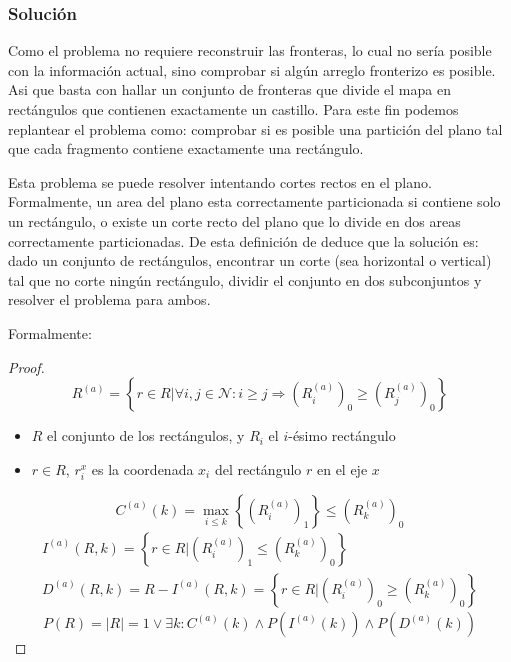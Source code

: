 \subsubsection{Soluci\'on}

Como el problema no requiere reconstruir las fronteras, lo cual no sería posible con la información actual, sino comprobar si algún arreglo fronterizo es posible. Asi que basta con hallar un conjunto de fronteras que divide el mapa en rectángulos que contienen exactamente un castillo. Para este fin podemos replantear el problema como: comprobar si es posible una partición del plano tal que cada fragmento contiene exactamente una rectángulo.

Esta problema se puede resolver intentando cortes rectos en el plano. Formalmente, un area del plano esta correctamente particionada si contiene solo un rectángulo, o existe un corte recto del plano que lo divide en dos areas correctamente particionadas. De esta definición de deduce que la solución es: dado un conjunto de rectángulos, encontrar un corte (sea horizontal o vertical) tal que no corte ningún rectángulo, dividir el conjunto en dos subconjuntos y resolver el problema para ambos.

Formalmente:

\begin{proof}
  \begin{equation}
    R^{(a)}=\left\{r\in R|\forall i,j\in \mathcal{N}:i\geq j\Rightarrow (R^{(a)}_i)_0\geq(R^{(a)}_j)_0\right\}
    \label{eq:sortedby}
  \end{equation}
  \begin{itemize}
    \item \(R\) el conjunto de los rectángulos, y \(R_i\) el \(i\)-ésimo rectángulo
    \item \(r\in R\), \(r^x_{i}\) es la coordenada \(x_i\) del rectángulo \(r\) en el eje \(x\)
  \end{itemize}
  \begin{equation}
    C^{(a)}(k)=\max_{i\leq k}{\left\{(R^{(a)}_i)_1\right\}}\leq (R^{(a)}_k)_0
    \label{eq:goodcut}
  \end{equation}
  \begin{align}
    I^{(a)}(R,k)=\left\{r\in R|(R^{(a)}_i)_1\leq (R^{(a)}_k)_0\right\} \label{eq:leftsplit} \\
    D^{(a)}(R,k)=R-I^{(a)}(R,k)=\left\{r\in R|(R^{(a)}_i)_0\geq (R^{(a)}_k)_0\right\} \label{eq:rightsplit}
  \end{align}
  \begin{equation}
    P(R)=\left\lvert R\right\rvert=1\lor \exists k: C^{(a)}(k)\land P(I^{(a)}(k))\land P(D^{(a)}(k))
    \label{eq:goodr}
  \end{equation}
\end{proof}

